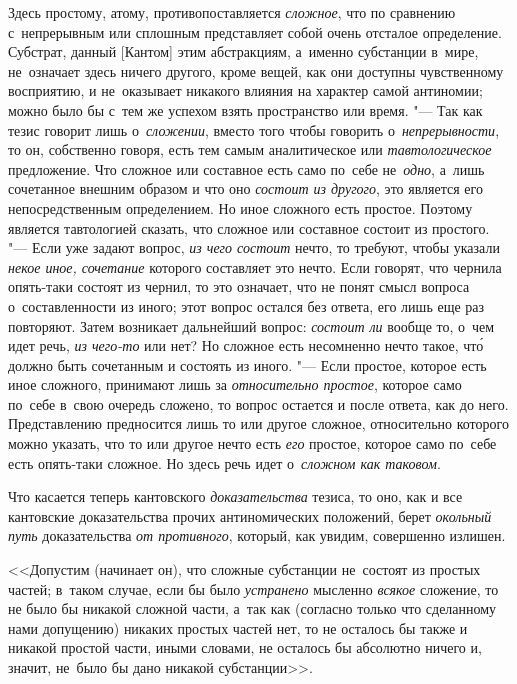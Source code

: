 Здесь простому, атому, противопоставляется {\em сложное}, что по сравнению
с~непрерывным или сплошным представляет собой очень отсталое определение.
Субстрат, данный [Кантом] этим абстракциям, а~именно субстанции в~мире,
не~означает здесь ничего другого, кроме вещей, как они доступны чувственному
восприятию, и не~оказывает никакого влияния на характер самой антиномии; можно
было бы с~тем же успехом взять пространство или время. "--- Так как тезис
говорит лишь о~{\em сложении}, вместо того чтобы говорить
о~{\em непрерывности}, то он, собственно говоря, есть тем самым аналитическое
или {\em тавтологическое} предложение. Что сложное или составное есть само
по~себе не~{\em одно}, а~лишь сочетанное внешним образом и что оно
{\em состоит из другого}, это является его непосредственным определением.
Но иное сложного есть простое. Поэтому является тавтологией сказать, что
сложное или составное состоит из простого. "--- Если уже задают вопрос,
{\em из чего состоит} нечто, то требуют, чтобы указали
{\em некое иное, сочетание} которого составляет это нечто. Если говорят, что
чернила опять-таки состоят из чернил, то это означает, что не понят смысл
вопроса о~составленности из иного; этот вопрос остался без ответа, его лишь
еще раз повторяют. Затем возникает дальнейший вопрос: {\em состоит ли} вообще
то, о~чем идет речь, {\em из чего-то} или нет? Но сложное есть несомненно нечто
такое, чт\'{о} должно быть сочетанным и состоять из иного. "--- Если простое,
которое есть иное сложного, принимают лишь за {\em относительно простое},
которое само по~себе в~свою очередь сложено, то вопрос остается и после
ответа, как до него. Представлению предносится лишь то или другое сложное,
относительно которого можно указать, что то или другое нечто есть
{\em его} простое, которое само по~себе есть опять-таки сложное. Но здесь
речь идет о~{\em сложном как таковом}.

Что касается теперь кантовского {\em доказательства}
тезиса, то оно, как и все кантовские доказательства прочих антиномических
положений, берет {\em окольный путь} доказательства
{\em от противного}, который, как увидим, совершенно излишен.

<<Допустим (начинает он), что сложные субстанции не~состоят из простых частей;
в~таком случае, если бы было {\em устранено} мысленно {\em всякое} сложение, то
не было бы никакой сложной части, а~так как (согласно только что сделанному
нами допущению) никаких простых частей нет, то не осталось бы также и никакой
простой части, иными словами, не осталось бы абсолютно ничего и, значит,
не~было бы дано никакой субстанции>>.

